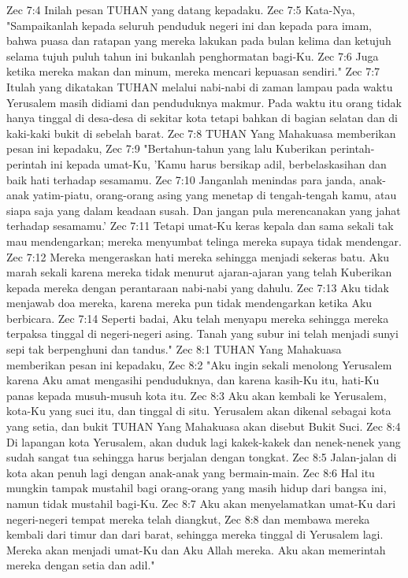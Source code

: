 Zec 7:4  Inilah pesan TUHAN yang datang kepadaku.
Zec 7:5  Kata-Nya, "Sampaikanlah kepada seluruh penduduk negeri ini dan kepada para imam, bahwa puasa dan ratapan yang mereka lakukan pada bulan kelima dan ketujuh selama tujuh puluh tahun ini bukanlah penghormatan bagi-Ku.
Zec 7:6  Juga ketika mereka makan dan minum, mereka mencari kepuasan sendiri."
Zec 7:7  Itulah yang dikatakan TUHAN melalui nabi-nabi di zaman lampau pada waktu Yerusalem masih didiami dan penduduknya makmur. Pada waktu itu orang tidak hanya tinggal di desa-desa di sekitar kota tetapi bahkan di bagian selatan dan di kaki-kaki bukit di sebelah barat.
Zec 7:8  TUHAN Yang Mahakuasa memberikan pesan ini kepadaku,
Zec 7:9  "Bertahun-tahun yang lalu Kuberikan perintah-perintah ini kepada umat-Ku, 'Kamu harus bersikap adil, berbelaskasihan dan baik hati terhadap sesamamu.
Zec 7:10  Janganlah menindas para janda, anak-anak yatim-piatu, orang-orang asing yang menetap di tengah-tengah kamu, atau siapa saja yang dalam keadaan susah. Dan jangan pula merencanakan yang jahat terhadap sesamamu.'
Zec 7:11  Tetapi umat-Ku keras kepala dan sama sekali tak mau mendengarkan; mereka menyumbat telinga mereka supaya tidak mendengar.
Zec 7:12  Mereka mengeraskan hati mereka sehingga menjadi sekeras batu. Aku marah sekali karena mereka tidak menurut ajaran-ajaran yang telah Kuberikan kepada mereka dengan perantaraan nabi-nabi yang dahulu.
Zec 7:13  Aku tidak menjawab doa mereka, karena mereka pun tidak mendengarkan ketika Aku berbicara.
Zec 7:14  Seperti badai, Aku telah menyapu mereka sehingga mereka terpaksa tinggal di negeri-negeri asing. Tanah yang subur ini telah menjadi sunyi sepi tak berpenghuni dan tandus."
Zec 8:1  TUHAN Yang Mahakuasa memberikan pesan ini kepadaku,
Zec 8:2  "Aku ingin sekali menolong Yerusalem karena Aku amat mengasihi penduduknya, dan karena kasih-Ku itu, hati-Ku panas kepada musuh-musuh kota itu.
Zec 8:3  Aku akan kembali ke Yerusalem, kota-Ku yang suci itu, dan tinggal di situ. Yerusalem akan dikenal sebagai kota yang setia, dan bukit TUHAN Yang Mahakuasa akan disebut Bukit Suci.
Zec 8:4  Di lapangan kota Yerusalem, akan duduk lagi kakek-kakek dan nenek-nenek yang sudah sangat tua sehingga harus berjalan dengan tongkat.
Zec 8:5  Jalan-jalan di kota akan penuh lagi dengan anak-anak yang bermain-main.
Zec 8:6  Hal itu mungkin tampak mustahil bagi orang-orang yang masih hidup dari bangsa ini, namun tidak mustahil bagi-Ku.
Zec 8:7  Aku akan menyelamatkan umat-Ku dari negeri-negeri tempat mereka telah diangkut,
Zec 8:8  dan membawa mereka kembali dari timur dan dari barat, sehingga mereka tinggal di Yerusalem lagi. Mereka akan menjadi umat-Ku dan Aku Allah mereka. Aku akan memerintah mereka dengan setia dan adil."
